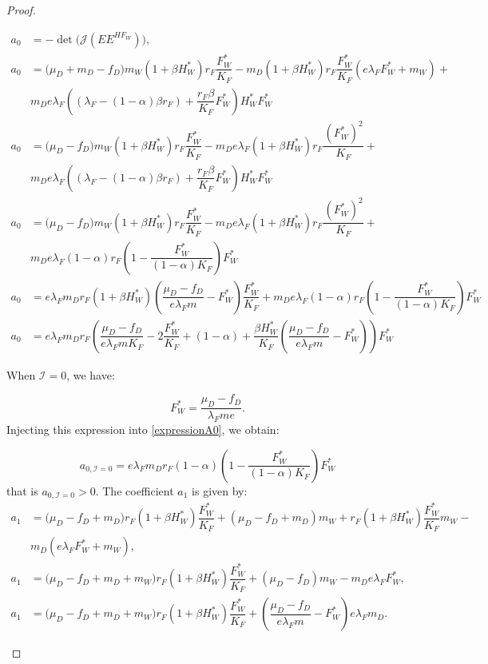 \documentclass{article}
\newcommand{\lfw}{\lambda_{F}}
\newcommand{\lfw}{\lambda_{F}}
\newcommand{\cI}{\mathcal{I}}
\begin{document}
\begin{proof}
\begin{itemize}
\begin{subequations}
\begin{align}
a_0 &= -\det\Big(\mathcal{J}(EE^{H F_W})\Big), \\
a_0 &= \Big(\mu_D + m_D -f_D \Big) m_W (1+\beta H_W^*) r_F \dfrac{F^*_W}{K_F}  - m_D (1 + \beta H_W^*) r_F \dfrac{F_W^*}{K_F}(e\lfw F_W^* + m_W) + \\
\nonumber
&  m_D e \lfw  \left((\lfw - (1-\alpha)\beta r_F)  + \dfrac{r_F\beta}{K_F} F_W^* \right)H_W^* F_W^* \\
a_0 &= \Big(\mu_D -f_D \Big) m_W (1+\beta H_W^*) r_F \dfrac{F^*_W}{K_F}  - m_D e\lfw (1 + \beta H_W^*) r_F \dfrac{(F_W^*)^2}{K_F} + \\
\nonumber
&  m_D e \lfw \left((\lfw - (1-\alpha)\beta r_F)  + \dfrac{r_F\beta}{K_F} F_W^* \right)H_W^*F_W^* \\
a_0 &= \Big(\mu_D -f_D \Big) m_W (1+\beta H_W^*) r_F \dfrac{F^*_W}{K_F}  - m_D e\lfw (1 + \beta H_W^*) r_F \dfrac{(F_W^*)^2}{K_F} + \\
\nonumber
&  m_D e \lfw (1- \alpha) r_F \left(1 - \dfrac{F_W^*}{(1- \alpha)K_F}\right) F_W^* \\
a_0 &= e \lfw m_D r_F (1 + \beta H_W^*) \left(\dfrac{\mu_D -f_D }{e \lfw m} - F_W^*\right) \dfrac{F_W^*}{K_F} + m_D e \lfw (1- \alpha) r_F \left(1 - \dfrac{F_W^*}{(1- \alpha)K_F}\right) F_W^*  \\
a_0 &= e \lfw m_D r_F \left(\dfrac{\mu_D -f_D }{e \lfw m K_F} - 2\dfrac{F_W^*}{K_F} + (1-\alpha) + \dfrac{\beta H_W^*}{K_F} \left(\dfrac{\mu_D -f_D }{e \lfw m} - F_W^*\right) \right) F_W^*  \label{expressionA0}
\end{align}
\end{subequations}

When $\cI = 0$, we have:

\begin{equation*}
F_W^* = \dfrac{\mu_D - f_D}{\lfw m e}.
\end{equation*} 
Injecting this expression into \eqref{expressionA0}, we obtain:

\begin{equation*}
a_{0, \cI=0} = e \lfw m_D r_F  (1- \alpha) \left(1 - \dfrac{F_W^*}{(1- \alpha)K_F}\right) F_W^* 
\end{equation*}
that is $a_{0, \cI=0}>0$. The coefficient $a_1$ is given by:
\begin{subequations}
\begin{align}
a_1 &= \big( \mu_D  -f_D + m_D) r_F(1+ \beta H_W^*) \dfrac{F^*_W}{K_F} + (\mu_D -f_D + m_D) m_W + r_F(1+ \beta H_W^*) \dfrac{F_W^*}{K_F} m_W - \\ \nonumber &m_D (e\lfw F^*_W + m_W), \\
a_1 &= \big( \mu_D  -f_D + m_D + m_W) r_F(1+ \beta H_W^*) \dfrac{F^*_W}{K_F} + (\mu_D -f_D) m_W  - m_D e\lfw F^*_W, \\
a_1 &= \big( \mu_D  -f_D + m_D + m_W) r_F(1+ \beta H_W^*) \dfrac{F^*_W}{K_F} + \left(\dfrac{\mu_D -f_D}{e\lfw m} - F_W^*\right) e \lfw m_D . \label{expressionA1}
\end{align}
\end{subequations}


\end{itemize}
\end{proof}
\end{document}
